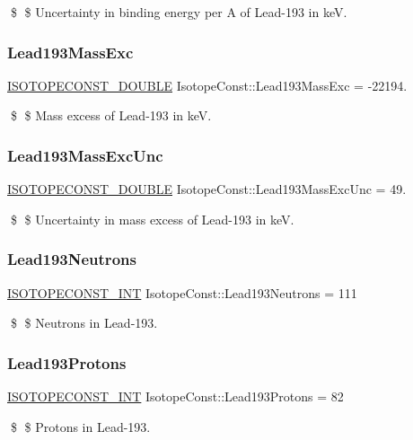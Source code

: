 \$ \$ Uncertainty in binding energy per A of Lead-\/193 in keV. \mbox{\label{group___isotope_const-_lead-_pb193_gaea2bb12a87afc2886fcc97dc46c34b65}} 
\subsubsection{\texorpdfstring{Lead193\+Mass\+Exc}{Lead193MassExc}}
{\footnotesize\ttfamily \mbox{\hyperlink{group___isotope_const-_macros_ga8f45a7272ce02c0b4c65c44636ed719a}{I\+S\+O\+T\+O\+P\+E\+C\+O\+N\+S\+T\+\_\+\+D\+O\+U\+B\+LE}} Isotope\+Const\+::\+Lead193\+Mass\+Exc = -\/22194.}

\$ \$ Mass excess of Lead-\/193 in keV. \mbox{\label{group___isotope_const-_lead-_pb193_gae9a85489cba65c84c9ab89645d8e5351}} 
\subsubsection{\texorpdfstring{Lead193\+Mass\+Exc\+Unc}{Lead193MassExcUnc}}
{\footnotesize\ttfamily \mbox{\hyperlink{group___isotope_const-_macros_ga8f45a7272ce02c0b4c65c44636ed719a}{I\+S\+O\+T\+O\+P\+E\+C\+O\+N\+S\+T\+\_\+\+D\+O\+U\+B\+LE}} Isotope\+Const\+::\+Lead193\+Mass\+Exc\+Unc = 49.}

\$ \$ Uncertainty in mass excess of Lead-\/193 in keV. \mbox{\label{group___isotope_const-_lead-_pb193_ga6f88824c8d429fe797a0c7bc6c2240b3}} 
\subsubsection{\texorpdfstring{Lead193\+Neutrons}{Lead193Neutrons}}
{\footnotesize\ttfamily \mbox{\hyperlink{group___isotope_const-_macros_ga5f18360b3e99483a35c32d789e62621c}{I\+S\+O\+T\+O\+P\+E\+C\+O\+N\+S\+T\+\_\+\+I\+NT}} Isotope\+Const\+::\+Lead193\+Neutrons = 111}

\$ \$ Neutrons in Lead-\/193. \mbox{\label{group___isotope_const-_lead-_pb193_gaf5279a577ff3cca1d0e2314e48339586}} 
\subsubsection{\texorpdfstring{Lead193\+Protons}{Lead193Protons}}
{\footnotesize\ttfamily \mbox{\hyperlink{group___isotope_const-_macros_ga5f18360b3e99483a35c32d789e62621c}{I\+S\+O\+T\+O\+P\+E\+C\+O\+N\+S\+T\+\_\+\+I\+NT}} Isotope\+Const\+::\+Lead193\+Protons = 82}

\$ \$ Protons in Lead-\/193. 